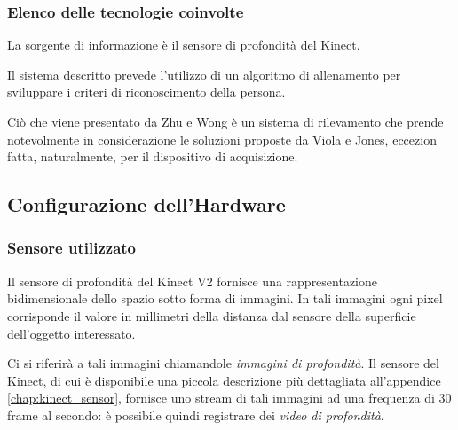             \subsubsection{Elenco delle tecnologie coinvolte}
                La sorgente di informazione è il sensore di profondità del Kinect.

                Il sistema descritto prevede l'utilizzo di un algoritmo di allenamento per sviluppare i criteri di riconoscimento della persona.

                Ciò che viene presentato da Zhu e Wong è un sistema di rilevamento che prende notevolmente in considerazione le soluzioni proposte da Viola e Jones, eccezion fatta, naturalmente, per il dispositivo di acquisizione.

        \subsection{Configurazione dell'Hardware}
        \label{sub:hardware_configuration}
            \subsubsection{Sensore utilizzato}
                Il sensore di profondità del Kinect V2 fornisce una rappresentazione bidimensionale dello spazio sotto forma di immagini. In tali immagini ogni pixel corrisponde il valore in millimetri della distanza dal sensore della superficie dell'oggetto interessato.

                Ci si riferirà a tali immagini chiamandole \emph{immagini di profondità}. Il sensore del Kinect, di cui è disponibile una piccola descrizione più dettagliata all'appendice \ref{chap:kinect_sensor}, fornisce uno stream di tali immagini ad una frequenza di 30 frame al secondo: è possibile quindi registrare dei \emph{video di profondità}.

